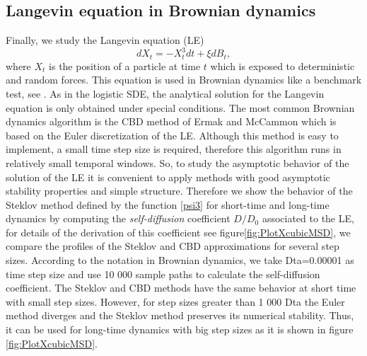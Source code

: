   \subsection{Langevin equation in Brownian dynamics}\label{sec52}
  Finally, we study the Langevin equation (LE)
  \begin{equation*}
      dX_t= -X_t^3dt+
      \xi dB_t, 
  \end{equation*}
    where $X_t$ is the position of a particle at time $t$ which is exposed to
  deterministic and random forces. This   equation is used in Brownian dynamics like a
  benchmark test, see \cite{Braanka1998}.  As in the logistic SDE, the analytical solution
  for the Langevin equation is only obtained under special conditions. The most common
  Brownian dynamics algorithm  is the CBD method of Ermak and  McCammon \cite{Ermak1978}
  which is based on the Euler discretization of the LE. Although this method is easy to
  implement, a small time step size is required, therefore this algorithm  runs in
  relatively small temporal windows. So, to study the  asymptotic behavior of the solution
  of the LE it is convenient to apply methods with good asymptotic stability properties
  and simple structure. Therefore we show the behavior of the Steklov  method defined by
  the function \eqref{psi3} for short-time and long-time dynamics by  computing  the {\it
  self-diffusion} coefficient $D/D_0$ associated to the LE, for details of the derivation
  of this coefficient see  %
  figure\ref{fig:PlotXcubicMSD}, we compare the profiles of the Steklov and
  CBD approximations for several step sizes. According to the notation in Brownian
  dynamics, we take Dta=0.00001 as time step size and use 10 000 sample paths to calculate
  the self-diffusion coefficient. The Steklov and  CBD methods have the same behavior at
  short time with small step sizes. However, for step sizes greater than 1 000 Dta the
  Euler method diverges and the Steklov method preserves its numerical stability. Thus, it
  can be used for long-time dynamics with  big step sizes as it is shown in  figure
  \ref{fig:PlotXcubicMSD}.
